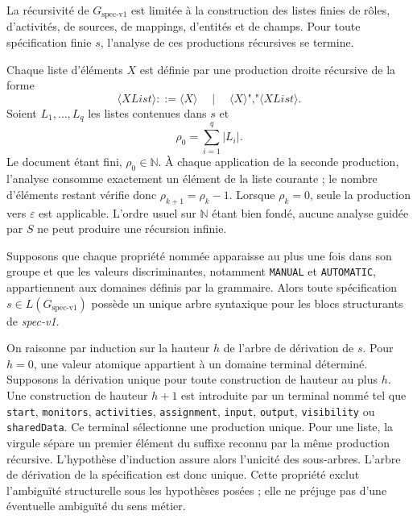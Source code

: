 \begin{proposition}
La récursivité de $G_{\text{spec-v1}}$ est limitée à la construction
des listes finies de rôles, d'activités, de sources, de mappings, d'entités et
de champs. Pour toute spécification finie $s$, l'analyse de ces productions
récursives se termine.
\end{proposition}

\begin{preuve}
Chaque liste d'éléments $X$ est définie par une production droite récursive de
la forme
\[
\langle XList\rangle ::= \langle X\rangle
\quad\mid\quad
\langle X\rangle\texttt{","}\langle XList\rangle.
\]
Soient $L_1,\ldots,L_q$ les listes contenues dans $s$ et
\[
\rho_0=\sum_{i=1}^{q}|L_i|.
\]
Le document étant fini, $\rho_0\in\mathbb{N}$. À chaque application de la
seconde production, l'analyse consomme exactement un élément de la liste
courante ; le nombre d'éléments restant vérifie donc
$\rho_{k+1}=\rho_k-1$. Lorsque $\rho_k=0$, seule la production vers
$\varepsilon$ est applicable. L'ordre usuel sur $\mathbb{N}$ étant bien fondé,
aucune analyse guidée par $S$ ne peut produire une récursion infinie.
\end{preuve}

\begin{proposition}
Supposons que chaque propriété nommée apparaisse au plus une fois dans son groupe
et que les valeurs discriminantes, notamment \texttt{MANUAL} et
\texttt{AUTOMATIC}, appartiennent aux domaines définis par la grammaire. Alors
toute spécification
$s\in L(G_{\text{spec-v1}})$ possède un unique arbre syntaxique pour
les blocs structurants de \textit{spec-v1}.
\end{proposition}

\begin{preuve}
On raisonne par induction sur la hauteur $h$ de l'arbre de dérivation de $s$.
Pour $h=0$, une valeur atomique appartient à un domaine terminal déterminé.
Supposons la dérivation unique pour toute construction de hauteur au plus $h$.
Une construction de hauteur $h+1$ est introduite par un terminal nommé tel que
\texttt{start}, \texttt{monitors}, \texttt{activities}, \texttt{assignment},
\texttt{input}, \texttt{output}, \texttt{visibility} ou \texttt{sharedData}.
Ce terminal sélectionne une production unique. Pour une liste, la virgule sépare
un premier élément du suffixe reconnu par la même production récursive.
L'hypothèse d'induction assure alors l'unicité des sous-arbres. L'arbre de
dérivation de la spécification est donc unique. Cette propriété exclut
l'ambiguïté structurelle sous les hypothèses posées ; elle ne préjuge pas d'une
éventuelle ambiguïté du sens métier.
\end{preuve}

